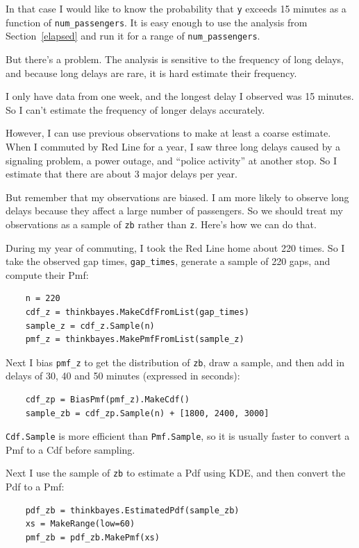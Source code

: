 \documentclass[12pt]{book}
\begin{document}
In that case I would like to know the probability that {\tt y} exceeds
15 minutes as a function of \verb"num_passengers".  It is easy enough
to use the
analysis from Section~\ref{elapsed} and run it for a range of
\verb"num_passengers".

But there's a problem.
The analysis is sensitive to the frequency of long delays, and
because long delays are rare, it is hard estimate
their frequency.

I only have data from one week,
and the longest delay I observed was 15 minutes.  So I can't
estimate the frequency of longer delays accurately.

However, I can use previous observations to make at least a coarse
estimate.  When I commuted by Red Line for a year, I saw three long
delays caused by a signaling problem, a power outage, and ``police
activity'' at another stop.  So I estimate that there are about
3 major delays per year.

But remember that my observations are biased.  I am more likely
to observe long delays because they affect a large number
of passengers.  So we should treat my observations as a sample
of {\tt zb} rather than {\tt z}.  Here's how we can do that.

During my year of commuting, I took the Red Line home about 220
times.  So I take the observed gap times, \verb"gap_times",
generate a sample of 220 gaps, and compute their Pmf:

\begin{verbatim}
    n = 220
    cdf_z = thinkbayes.MakeCdfFromList(gap_times)
    sample_z = cdf_z.Sample(n)
    pmf_z = thinkbayes.MakePmfFromList(sample_z)
\end{verbatim}

Next I bias \verb"pmf_z" to get the distribution of
{\tt zb}, draw a sample, and then add in delays of
30, 40 and 50 minutes (expressed in seconds):

\begin{verbatim}
    cdf_zp = BiasPmf(pmf_z).MakeCdf()
    sample_zb = cdf_zp.Sample(n) + [1800, 2400, 3000]
\end{verbatim}

{\tt Cdf.Sample} is more efficient than {\tt Pmf.Sample}, so it
is usually faster to convert a Pmf to a Cdf before sampling.

Next I use the sample of {\tt zb} to estimate a Pdf using
KDE, and then convert the Pdf to a Pmf:

\begin{verbatim}
    pdf_zb = thinkbayes.EstimatedPdf(sample_zb)
    xs = MakeRange(low=60)
    pmf_zb = pdf_zb.MakePmf(xs)
\end{verbatim}
\end{document}
